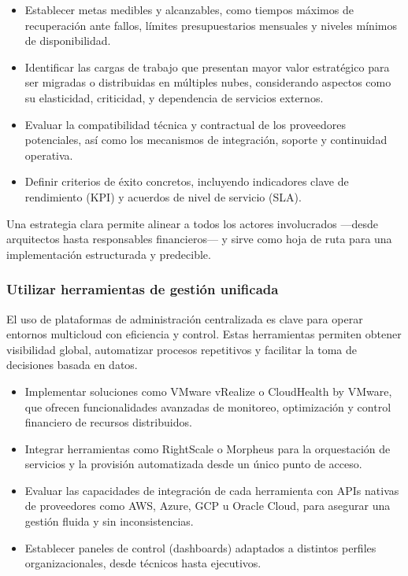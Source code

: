 {                \begin{itemize}
                    \item Establecer metas medibles y alcanzables, como tiempos máximos de recuperación ante fallos, límites presupuestarios mensuales y niveles mínimos de disponibilidad.
                    \item Identificar las cargas de trabajo que presentan mayor valor estratégico para ser migradas o distribuidas en múltiples nubes, considerando aspectos como su elasticidad, criticidad, y dependencia de servicios externos.
                    \item Evaluar la compatibilidad técnica y contractual de los proveedores potenciales, así como los mecanismos de integración, soporte y continuidad operativa.
                    \item Definir criterios de éxito concretos, incluyendo indicadores clave de rendimiento (KPI) y acuerdos de nivel de servicio (SLA).
                \end{itemize}
                
                Una estrategia clara permite alinear a todos los actores involucrados —desde arquitectos hasta responsables financieros— y sirve como hoja de ruta para una implementación estructurada y predecible.
                
            \subsubsection{Utilizar herramientas de gestión unificada}
                El uso de plataformas de administración centralizada es clave para operar entornos multicloud con eficiencia y control. Estas herramientas permiten obtener visibilidad global, automatizar procesos repetitivos y facilitar la toma de decisiones basada en datos.
                
                \begin{itemize}
                    \item Implementar soluciones como VMware vRealize o CloudHealth by VMware, que ofrecen funcionalidades avanzadas de monitoreo, optimización y control financiero de recursos distribuidos.
                    \item Integrar herramientas como RightScale o Morpheus para la orquestación de servicios y la provisión automatizada desde un único punto de acceso.
                    \item Evaluar las capacidades de integración de cada herramienta con APIs nativas de proveedores como AWS, Azure, GCP u Oracle Cloud, para asegurar una gestión fluida y sin inconsistencias.
                    \item Establecer paneles de control (dashboards) adaptados a distintos perfiles organizacionales, desde técnicos hasta ejecutivos.
                \end{itemize}
                
}
